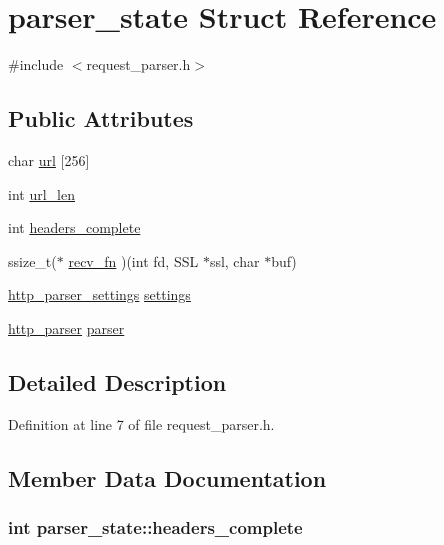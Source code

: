 \hypertarget{structparser__state}{\section{parser\-\_\-state Struct Reference}
\label{structparser__state}
}


{\ttfamily \#include $<$request\-\_\-parser.\-h$>$}

\subsection*{Public Attributes}
\begin{DoxyCompactItemize}
\item 
char \hyperlink{structparser__state_a64222808a9174a17ae2d25cb7ab72383}{url} \mbox{[}256\mbox{]}
\item 
int \hyperlink{structparser__state_a3ece333d4625d8c6a5f696a738b2fc41}{url\-\_\-len}
\item 
int \hyperlink{structparser__state_ae9786e3f8c7bc787516749856ad0cc42}{headers\-\_\-complete}
\item 
ssize\-\_\-t($\ast$ \hyperlink{structparser__state_ad02c5f0bb7a54a5be951120be343e767}{recv\-\_\-fn} )(int fd, S\-S\-L $\ast$ssl, char $\ast$buf)
\item 
\hyperlink{structhttp__parser__settings}{http\-\_\-parser\-\_\-settings} \hyperlink{structparser__state_a88886f7995880a05fd64c6ce943c4d2b}{settings}
\item 
\hyperlink{structhttp__parser}{http\-\_\-parser} \hyperlink{structparser__state_aaf6745c9db055761cd8da5f0d5e76d04}{parser}
\end{DoxyCompactItemize}


\subsection{Detailed Description}


Definition at line 7 of file request\-\_\-parser.\-h.



\subsection{Member Data Documentation}
\hypertarget{structparser__state_ae9786e3f8c7bc787516749856ad0cc42}{
\subsubsection[{headers\-\_\-complete}]{\setlength{\rightskip}{0pt plus 5cm}int parser\-\_\-state\-::headers\-\_\-complete}}\label{structparser__state_ae9786e3f8c7bc787516749856ad0cc42}


